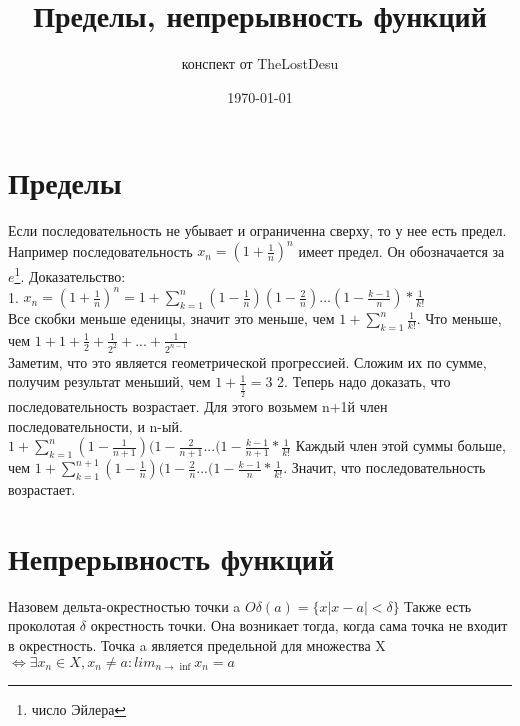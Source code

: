\documentclass[a4paper,12pt]{article}
\author{конспект от TheLostDesu}
\title{Пределы, непрерывность функций}
\date{\today}
\begin{document}
\maketitle
\section{Пределы}
Если последовательность не убывает и ограниченна сверху, то у нее есть предел.\\
Например последовательность $x_n = (1 + \frac{1}{n})^n$ имеет предел. Он обозначается за $e$\footnote{число Эйлера}. Доказательство: \\
1. $x_n = (1+\frac{1}{n})^n = 1 + \sum^n_{k=1} (1-\frac{1}{n})(1-\frac{2}{n})...(1-\frac{k-1}{n})*\frac{1}{k!}$\\
Все скобки меньше еденицы, значит это меньше, чем $1 + \sum^n_{k=1} \frac{1}{k!}$. Что меньше, чем $1 + 1 + \frac{1}{2} + \frac{1}{2^2}+...+\frac{1}{2^{n-1}}$\\ Заметим, что это является геометрической прогрессией. Сложим их по сумме, получим результат меньший, чем $1 + \frac{1}{\frac{1}{2}} = 3$
2. Теперь надо доказать, что последовательность возрастает. 
Для этого возьмем n+1й член последовательности, и n-ый.\\
$1 + \sum^n_{k=1}(1 - \frac{1}{n+1})(1-\frac{2}{n+1}...(1-\frac{k-1}{n+1} * \frac{1}{k!}$
Каждый член этой суммы больше, чем $1 + \sum^{n+1}_{k=1}(1 - \frac{1}{n})(1-\frac{2}{n}...(1-\frac{k-1}{n} * \frac{1}{k!}$. Значит, что последовательность возрастает.
\section{Непрерывность функций}
Назовем дельта-окрестностью точки a $O \delta (a) = \{ x|x-a|< \delta \}$
Также есть проколотая $\delta$ окрестность точки. Она возникает тогда, когда сама точка не входит в окрестность.
Точка a является предельной для множества X $\Leftrightarrow \exists x_n  \in X, x_n \neq a:	lim_{n \to \inf} x_n = a$
\end{document}
